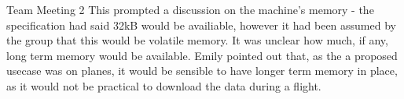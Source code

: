 \documentclass{article}
\begin{document}
\begin{Minutes}{Team Meeting 2}
This prompted a discussion on the machine's memory - the specification had said 32kB would be availiable,
however it had been assumed by the group that this would be volatile memory. It was unclear how much, if
any, long term memory would be available. Emily pointed out that, as the a proposed usecase was on planes,
it would be sensible to have longer term memory in place, as it would not be practical to download the data
during a flight.

\end{Minutes}
\end{document}
